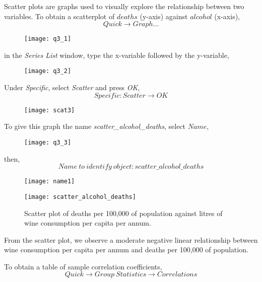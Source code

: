 \documentclass[12pt]{report}
\begin{document}
		\noindent Scatter plots are graphs used to visually explore the relationship between two variables. To obtain a scatterplot of $deaths$ (y-axis) against $alcohol$ (x-axis),
		$$Quick \to Graph \dots$$
		\begin{figure}[H]
			\centerline{\texttt{[image: q3\_1]}}
		\end{figure}
		\vspace{-\baselineskip}
		\noindent in the \textit{Series List} window, type the x-variable followed by the y-variable,
		\begin{figure}[H]
			\centerline{\texttt{[image: q3\_2]}}
		\end{figure}
		\vspace{-\baselineskip}	
		\noindent Under \textit{Specific}, select \textit{Scatter} and press \textit{OK},
		$$Specific:Scatter \to OK$$
		\begin{figure}[H]
			\centerline{\texttt{[image: scat3]}}
		\end{figure}
		\vspace{-\baselineskip}	
		\noindent To give this graph the name \textit{scatter\_alcohol\_deaths}, select $Name$,
		\begin{figure}[H]
			\centerline{\texttt{[image: q3\_3]}}
		\end{figure}
		\vspace{-\baselineskip}	
		then, $$Name\ to\ identify\ object:scatter\_alcohol\_deaths$$
		\begin{figure}[H]
			\centering
			\texttt{[image: name1]}
		\end{figure}
		\vspace{-\baselineskip}	
		\begin{figure}[H]
			\centerline{\texttt{[image: scatter\_alcohol\_deaths]}}
			\caption{Scatter plot of deaths per 100,000 of population against litres of wine consumption per capita per annum.}
			\label{fig:scat1}
		\end{figure}
		\vspace{-\baselineskip}	
		\noindent From the scatter plot, we observe a moderate negative linear relationship between wine consumption per capita per annum and  deaths per 100,000 of population. \par
		\newpage
		\noindent To obtain a table of sample correlation coefficients,
		$$Quick \to Group\ Statistics \to Correlations$$
		
\end{document}
